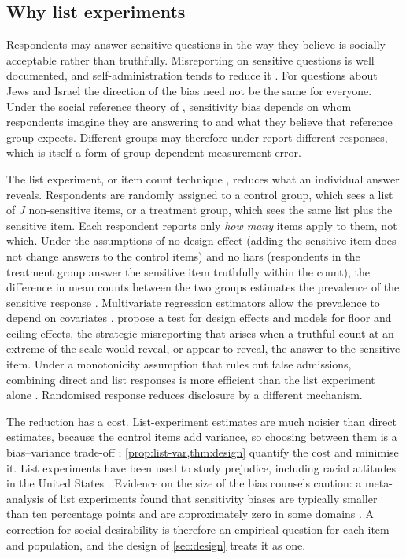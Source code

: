 \subsection{Why list experiments}\label{sec:bg-list}

Respondents may answer sensitive questions in the way they believe is socially acceptable rather than truthfully. Misreporting on sensitive questions is well documented, and self-administration tends to reduce it \citep{tourangeau2007,kreuter2008}. For questions about Jews and Israel the direction of the bias need not be the same for everyone. Under the social reference theory of \citet{blair2020}, sensitivity bias depends on whom respondents imagine they are answering to and what they believe that reference group expects. Different groups may therefore under-report different responses, which is itself a form of group-dependent measurement error.

The list experiment, or item count technique \citep{miller1984}, reduces what an individual answer reveals. Respondents are randomly assigned to a control group, which sees a list of $J$ non-sensitive items, or a treatment group, which sees the same list plus the sensitive item. Each respondent reports only \emph{how many} items apply to them, not which. Under the assumptions of no design effect (adding the sensitive item does not change answers to the control items) and no liars (respondents in the treatment group answer the sensitive item truthfully within the count), the difference in mean counts between the two groups estimates the prevalence of the sensitive response \citep{glynn2013,blair2012}. Multivariate regression estimators allow the prevalence to depend on covariates \citep{imai2011,corstange2009}.  propose a test for design effects and models for floor and ceiling effects, the strategic misreporting that arises when a truthful count at an extreme of the scale would reveal, or appear to reveal, the answer to the sensitive item. Under a monotonicity assumption that rules out false admissions, combining direct and list responses is more efficient than the list experiment alone \citep{aronow2015}. Randomised response \citep{warner1965,blair2015} reduces disclosure by a different mechanism.

The reduction has a cost. List-experiment estimates are much noisier than direct estimates, because the control items add variance, so choosing between them is a bias--variance trade-off \citep{blair2020,glynn2013}; \cref{prop:list-var,thm:design} quantify the cost and minimise it. List experiments have been used to study prejudice, including racial attitudes in the United States \citep{kuklinski1997,kuklinski1997ajps,imai2011}. Evidence on the size of the bias counsels caution: a meta-analysis of list experiments found that sensitivity biases are typically smaller than ten percentage points and are approximately zero in some domains \citep{blair2020}. A correction for social desirability is therefore an empirical question for each item and population, and the design of \cref{sec:design} treats it as one.
